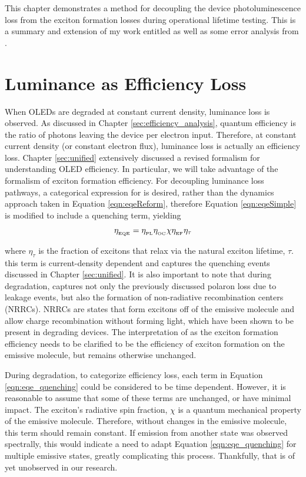 \documentclass[../thesis.tex]{subfiles}
\begin{document}
This chapter demonstrates a method for decoupling the device photoluminescence loss from the exciton formation losses during operational lifetime testing.  
This is a summary and extension of my work entitled \textcite{Hershey2017} as well as some error analysis from \textcite{Bangsund2018a}.

\section{Luminance as Efficiency Loss}

When OLEDs are degraded at constant current density, luminance loss is observed.  
As discussed in Chapter \ref{sec:efficiency_analysis}, quantum efficiency is the ratio of photons leaving the device per electron input.
Therefore, at constant current density (or constant electron flux), luminance loss is actually an efficiency loss.
Chapter \ref{sec:unified} extensively discussed a revised formalism for understanding OLED efficiency.
In particular, we will take advantage of the formalism of exciton formation efficiency.  
For decoupling luminance loss pathways, a categorical expression for \eqe is desired, rather than the dynamics approach taken in Equation \ref{eqn:eqeReform}, therefore Equation \ref{eqn:eqeSimple} is modified to include a quenching term, yielding

\begin{equation}
\eta_{_\text{\tiny EQE}}=\eta_{_\text{\tiny PL}}\eta_{_\text{\tiny OC}}\chi\eta_{_\text{\tiny EF}}\eta_\tau
\label{eqn:eqe_quenching}
\end{equation}

where $\eta_\tau$ is the fraction of excitons that relax via the natural exciton lifetime, $\tau$.  
this term is current-density dependent and captures the quenching events discussed in Chapter \ref{sec:unified}.
It is also important to note that during degradation, \ef captures not only the previously discussed polaron loss due to leakage events, but also the formation of non-radiative recombination centers (NRRCs).
NRRCs are states that form excitons off of the emissive molecule and allow charge recombination without forming light, which have been shown to be present in degrading devices.\supercite{Kondakov2003,Kondakov2007d}
The interpretation of \ef as the exciton formation efficiency needs to be clarified to be the efficiency of exciton formation on the emissive molecule, but remains otherwise unchanged.

During degradation, to categorize efficiency loss, each term in Equation \ref{eqn:eqe_quenching} could be considered to be time dependent.  
However, it is reasonable to assume that some of these terms are unchanged, or have minimal impact.
The exciton's radiative spin fraction, $\chi$ is a quantum mechanical property of the emissive molecule.
Therefore, without changes in the emissive molecule, this term should remain constant.  
If emission from another state was observed spectrally, this would indicate a need to adapt Equation \ref{eqn:eqe_quenching} for multiple emissive states, greatly complicating this process.
Thankfully, that is of yet unobserved in our research.
\end{document}
